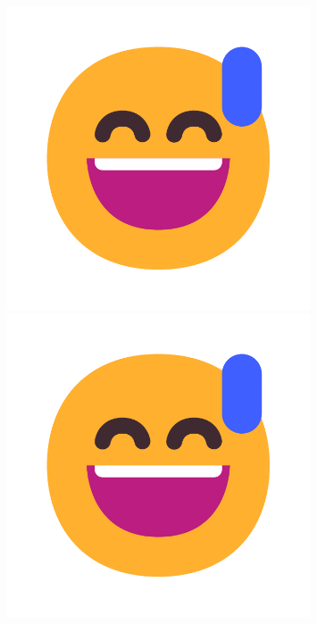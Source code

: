 \documentclass[letterpaper]{article}
\begin{document}
\begin{figure}
    \centering
    \begin{minipage}[b]{0.3\textwidth}
        \centering
        \includegraphics[width=0.8\textwidth]{assets/example.pdf}
    \end{minipage}
    \begin{minipage}[b]{0.3\textwidth}
        \centering
        \includegraphics[width=0.8\textwidth]{assets/example.pdf}

\end{minipage}
\end{figure}
\end{document}
